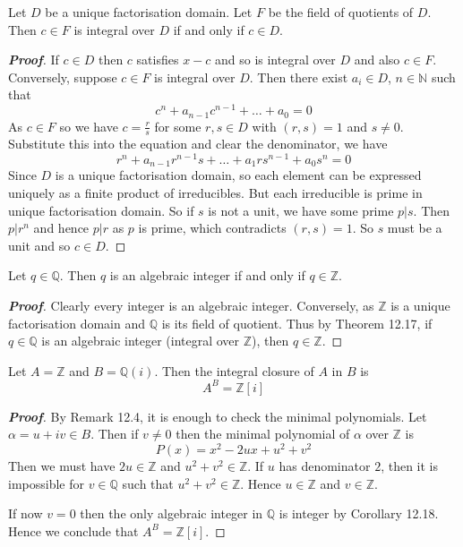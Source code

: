 \begin{theorem} Let $D$ be a unique factorisation domain. Let $F$ be the field of quotients of $D$. Then
$c \in F$ is integral over $D$ if and only if $c \in D$.
\end{theorem}
\begin{proof}[\bf Proof] If $c \in D$ then $c$ satisfies $x-c$ and so is integral over $D$ and also $c \in F$.
Conversely, suppose $c \in F$ is integral over $D$. Then there exist $a_i \in D$, $n \in \mathbb{N}$ such that
$$c^n+a_{n-1}c^{n-1}+\ldots+a_0=0$$
As $c \in F$ so we have $c=\frac{r}{s}$ for some $r,s \in D$ with $(r,s)=1$ and $s \neq 0$. Substitute this into the equation and
clear the denominator, we have
$$r^n+a_{n-1}r^{n-1}s+\ldots+a_1rs^{n-1}+a_0s^n=0$$
Since $D$ is a unique factorisation domain, so each element can be expressed uniquely as a finite product of irreducibles. But each irreducible is prime in unique factorisation domain. So if $s$ is not a unit, we have some prime $p|s$. Then $p|r^n$ and hence $p|r$ as $p$ is prime, which contradicts $(r,s)=1$. So $s$ must be a unit and so $c \in D$.
\end{proof}
\begin{corollary} Let $q \in \mathbb{Q}$. Then $q$ is an algebraic integer if and only if $q \in \mathbb{Z}$.
\end{corollary}
\begin{proof}[\bf Proof] Clearly every integer is an algebraic integer. Conversely, as $\mathbb{Z}$ is a unique factorisation
domain and $\mathbb{Q}$ is its field of quotient. Thus by Theorem 12.17, if $q \in \mathbb{Q}$ is an algebraic integer (integral over $\mathbb{Z}$), then $q \in \mathbb{Z}$.
\end{proof}
\begin{proposition} Let $A=\mathbb{Z}$ and $B=\mathbb{Q}(i)$. Then the integral closure of $A$ in $B$ is
$$A^B=\mathbb{Z}[i]$$
\end{proposition}
\begin{proof}[\bf Proof] By Remark 12.4, it is enough to check the minimal polynomials. Let $\alpha=u+iv \in B$. Then if $v \neq 0$ then the minimal polynomial of $\alpha$ over $\mathbb{Z}$ is
$$P(x)=x^2-2ux+u^2+v^2$$
Then we must have $2u \in \mathbb{Z}$ and $u^2+v^2 \in \mathbb{Z}$. If $u$ has denominator $2$, then it is impossible for $v \in \mathbb{Q}$ such that $u^2+v^2 \in \mathbb{Z}$. Hence $u \in \mathbb{Z}$ and $v \in \mathbb{Z}$.

If now $v=0$ then the only algebraic integer in $\mathbb{Q}$ is integer by Corollary 12.18. Hence we conclude that
$A^B=\mathbb{Z}[i]$.
\end{proof}

